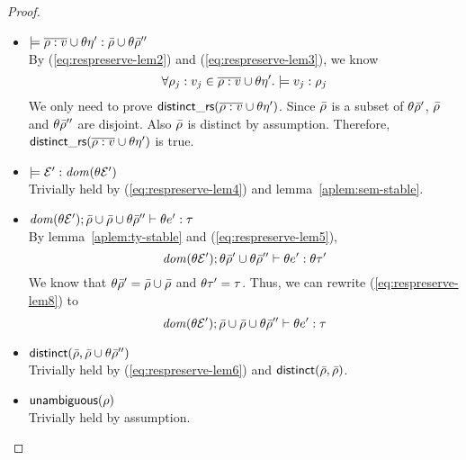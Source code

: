 \begin{proof}
\begin{itemize}
  \item $\models \overline{\rho:v} \cup \theta
      \eta':\bar{\rho} \cup \theta \bar{\rho}''$ \\
    By (\ref{eq:respreserve-lem2}) and (\ref{eq:respreserve-lem3}), we
    know
    \begin{equation*}
      \forall \rho_j:v_j \in \overline{\rho:v} \cup \theta
      \eta'. \models v_j:\rho_j
    \end{equation*}
    We only need to prove ${\sf distinct\_rs}(\overline{\rho:v} \cup \theta
    \eta')$. Since $\bar{\rho}$ is a subset of $\theta
    \bar{\rho}'$, $\bar{\rho}$ and $\theta \bar{\rho}''$ are
    disjoint. Also $\bar{\rho}$ is distinct by assumption. Therefore, 
    ${\sf distinct\_rs}(\overline{\rho:v} \cup \theta \eta')$ is true.

  \item $\models \mathcal{E}':{\it dom }(\theta \mathcal{E}')$ \\
    Trivially held by (\ref{eq:respreserve-lem4}) and
    lemma~\ref{aplem:sem-stable}. 

  \item ${\it dom }(\theta \mathcal{E}'); 
    \bar{\rho} \cup \bar{\rho} \cup \theta \bar{\rho}''
    \vdash \theta e':\tau$ \\
    By lemma~\ref{aplem:ty-stable} and (\ref{eq:respreserve-lem5}),
    \begin{equation}
      \label{eq:respreserve-lem8}
      {\it dom }(\theta \mathcal{E}'); 
      \theta \bar{\rho}' \cup \theta \bar{\rho}'' 
      \vdash \theta e':\theta \tau'
    \end{equation}
    We know that $\theta \bar{\rho}' = \bar{\rho} \cup \bar{\rho}$ and
    $\theta \tau' = \tau$. Thus, we can rewrite
    (\ref{eq:respreserve-lem8}) to
    \begin{equation*}
      {\it dom }(\theta \mathcal{E}'); 
      \bar{\rho} \cup \bar{\rho} \cup \theta \bar{\rho}''
      \vdash \theta e':\tau
    \end{equation*}

  \item ${\sf distinct}(\bar{\rho}, \bar{\rho} \cup \theta \bar{\rho}'')$\\
    Trivially held by (\ref{eq:respreserve-lem6}) and
    ${\sf distinct}(\bar{\rho}, \bar{\rho})$.

  \item ${\sf unambiguous}(\rho)$ \\
    Trivially held by assumption.

  \end{itemize}
\end{proof}

